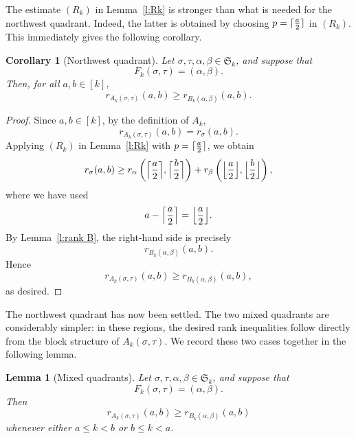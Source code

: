 \documentclass[12pt]{amsart}
\DeclarePairedDelimiter\ceil{\lceil}{\rceil}
\DeclarePairedDelimiter\floor{\lfloor}{\rfloor}
\newtheorem{cor}[thm]{Corollary}
\newtheorem{lem}[thm]{Lemma}
\theoremstyle{definition}
\numberwithin{equation}{section}
\begin{document}
The estimate $(R_k)$ in Lemma~\ref{l:Rk} is stronger than what is needed for the northwest
quadrant. Indeed, the latter is obtained by choosing
$p=\ceil{\tfrac{a}{2}}$ in $(R_k)$. This immediately gives the following corollary.

\begin{cor}[Northwest quadrant]\label{c:NW quadrant}
Let $\sigma,\tau,\alpha,\beta\in\mathfrak S_k$, and suppose that
\begin{equation*}
F_k(\sigma,\tau)=(\alpha,\beta).
\end{equation*}
Then, for all $a,b\in[k]$,
\begin{equation*}
r_{A_k(\sigma,\tau)}(a,b)
\geq
r_{B_k(\alpha,\beta)}(a,b).
\end{equation*}
\end{cor}

\begin{proof}
Since $a,b\in[k]$, by the definition of $A_k$,
\begin{equation*}
r_{A_k(\sigma,\tau)}(a,b)=r_\sigma(a,b).
\end{equation*}
Applying $(R_k)$ in Lemma~\ref{l:Rk} with
$p=\ceil{\tfrac{a}{2}}$,
we obtain
\begin{equation*}
r_\sigma(a,b)
\geq{}
r_\alpha\left(
\ceil[\Big]{\frac{a}{2}},
\ceil[\Big]{\frac{b}{2}}
\right)
+
r_\beta\left(
\floor[\Big]{\frac{a}{2}},
\floor[\Big]{\frac{b}{2}}
\right),
\end{equation*}
where we have used
\begin{equation*}
a-\ceil[\Big]{\frac{a}{2}}
=
\floor[\Big]{\frac{a}{2}}.
\end{equation*}
By Lemma~\ref{l:rank B}, the right-hand side is precisely
\begin{equation*}
r_{B_k(\alpha,\beta)}(a,b).
\end{equation*}
Hence
\begin{equation*}
r_{A_k(\sigma,\tau)}(a,b)
\geq
r_{B_k(\alpha,\beta)}(a,b),
\end{equation*}
as desired.
\end{proof}

The northwest quadrant has now been settled. The two mixed quadrants are
considerably simpler: in these regions, the desired rank inequalities
follow directly from the block structure of $A_k(\sigma,\tau)$. We record
these two cases together in the following lemma.

\begin{lem}[Mixed quadrants]\label{l:mixed quadrants}
Let $\sigma,\tau,\alpha,\beta\in\mathfrak S_k$, and suppose that
\begin{equation*}
F_k(\sigma,\tau)=(\alpha,\beta).
\end{equation*}
Then
\begin{equation*}
r_{A_k(\sigma,\tau)}(a,b)
\geq
r_{B_k(\alpha,\beta)}(a,b)
\end{equation*}
whenever either $a\leq k<b$ or $b\leq k<a$.
\end{lem}
\end{document}
